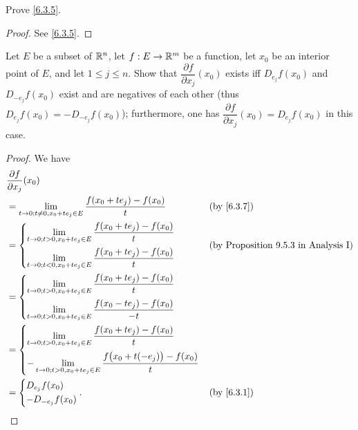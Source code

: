 \exercisesection

\begin{ex}\label{ex:6.3.1}
  Prove \cref{6.3.5}.
\end{ex}

\begin{proof}
  See \cref{6.3.5}.
\end{proof}

\begin{ex}\label{ex:6.3.2}
  Let \(E\) be a subset of \(\mathbb{R}^n\), let \(f : E \to \mathbb{R}^m\) be a function, let \(x_0\) be an interior point of \(E\), and let \(1 \leq j \leq n\).
  Show that \(\dfrac{\partial f}{\partial x_j}(x_0)\) exists iff \(D_{e_j} f(x_0)\) and \(D_{-e_j} f(x_0)\) exist and are negatives of each other
  (thus \(D_{e_j} f(x_0) = -D_{-e_j} f(x_0)\));
  furthermore, one has \(\dfrac{\partial f}{\partial x_j}(x_0) = D_{e_j} f(x_0)\) in this case.
\end{ex}

\begin{proof}
  We have
  \begin{align*}
     & \dfrac{\partial f}{\partial x_j}(x_0)                                                                    \\
     & = \lim_{t \to 0 ; t \neq 0, x_0 + t e_j \in E} \dfrac{f(x_0 + t e_j) - f(x_0)}{t}        &  & \by{6.3.7} \\
     & = \begin{dcases}
           \lim_{t \to 0 ; t > 0, x_0 + t e_j \in E} \dfrac{f(x_0 + t e_j) - f(x_0)}{t} \\
           \lim_{t \to 0 ; t < 0, x_0 + t e_j \in E} \dfrac{f(x_0 + t e_j) - f(x_0)}{t}
         \end{dcases}          &  & \text{(by Proposition 9.5.3 in Analysis I)}                           \\
     & = \begin{dcases}
           \lim_{t \to 0 ; t > 0, x_0 + t e_j \in E} \dfrac{f(x_0 + t e_j) - f(x_0)}{t} \\
           \lim_{t \to 0 ; t > 0, x_0 + t e_j \in E} \dfrac{f(x_0 - t e_j) - f(x_0)}{-t}
         \end{dcases}                           \\
     & = \begin{dcases}
           \lim_{t \to 0 ; t > 0, x_0 + t e_j \in E} \dfrac{f(x_0 + t e_j) - f(x_0)}{t} \\
           -\lim_{t \to 0 ; t > 0, x_0 + t e_j \in E} \dfrac{f\big(x_0 + t (-e_j)\big) - f(x_0)}{t}
         \end{dcases}                \\
     & = \begin{dcases}
           D_{e_j} f(x_0) \\
           - D_{-e_j} f(x_0)
         \end{dcases}.                                                                        &  & \by{6.3.1}
  \end{align*}
\end{proof}

